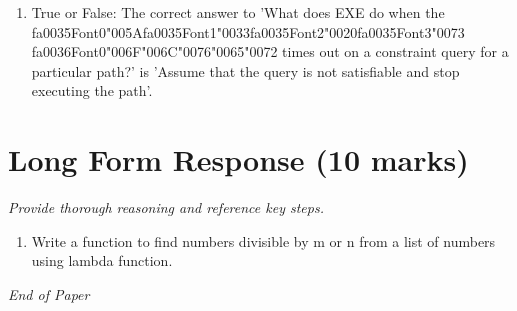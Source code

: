 \documentclass[12pt]{article}
\begin{document}
\begin{enumerate}[label=\arabic*.]
\item True or False: The correct answer to 'What does EXE do when the {\csname fa0035Font0\endcsname\char"005A}{\csname fa0035Font1\endcsname\char"0033}{\csname fa0035Font2\endcsname\char"0020}{\csname fa0035Font3\endcsname\char"0073} {\csname fa0036Font0\endcsname\char"006F}{\char"006C}{\char"0076}{\char"0065}{\char"0072} times out on a constraint query for a particular path?' is 'Assume that the query is not satisfiable and stop executing the path'.
\end{enumerate}

\section*{Long Form Response (10 marks)}
\textit{Provide thorough reasoning and reference key steps.}
\begin{enumerate}[label=\arabic*.]
\item Write a function to find numbers divisible by m or n from a list of numbers using lambda
function.
\end{enumerate}

\vfill
\noindent\textit{End of Paper}
\end{document}
